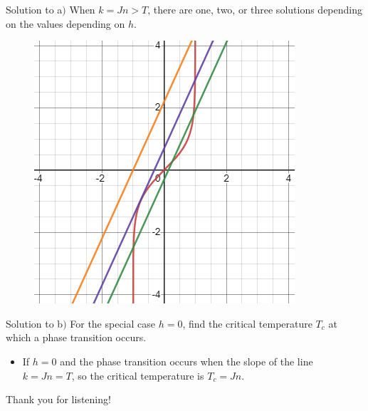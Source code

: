 \documentclass[10pt,aspectratio=43,mathserif,table]{beamer}
\begin{document}
\begin{frame}{Solution to a$)$}
	When $k=Jn > T$, there are one, two, or three solutions depending on the values depending on $h$.
	\begin{figure}
		\centering
		\includegraphics[width=0.4\linewidth]{p3.jpg}
	\end{figure}
\end{frame}

\begin{frame}{Solution to b$)$}
	For the special case $h = 0$, find the critical temperature $T_c$ at which a phase transition occurs.
	\begin{itemize}
		\item If $h = 0$ and the phase transition occurs when the slope of the line $k=Jn=T$, so the critical temperature is $T_c = Jn$.
	\end{itemize}
	
\end{frame}

\begin{frame}
	\LARGE \centering Thank you for listening!
\end{frame}
\end{document}
